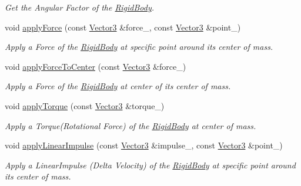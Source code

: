 \begin{DoxyCompactItemize}
\begin{DoxyCompactList}\small\item\em Get the Angular Factor of the \hyperlink{class_magnum_1_1_physics3_1_1_rigid_body}{Rigid\+Body}. \end{DoxyCompactList}\item 
void \hyperlink{class_magnum_1_1_physics3_1_1_rigid_body_a4044caf96a955b23e29e7c33cd6e837c}{apply\+Force} (const \hyperlink{class_magnum_1_1_vector3}{Vector3} \&force\+\_\+, const \hyperlink{class_magnum_1_1_vector3}{Vector3} \&point\+\_\+)
\begin{DoxyCompactList}\small\item\em Apply a Force of the \hyperlink{class_magnum_1_1_physics3_1_1_rigid_body}{Rigid\+Body} at specific point around its center of mass. \end{DoxyCompactList}\item 
void \hyperlink{class_magnum_1_1_physics3_1_1_rigid_body_a1cf514dc13d4a90274716905e82af84d}{apply\+Force\+To\+Center} (const \hyperlink{class_magnum_1_1_vector3}{Vector3} \&force\+\_\+)
\begin{DoxyCompactList}\small\item\em Apply a Force of the \hyperlink{class_magnum_1_1_physics3_1_1_rigid_body}{Rigid\+Body} at center of its center of mass. \end{DoxyCompactList}\item 
void \hyperlink{class_magnum_1_1_physics3_1_1_rigid_body_aab9670ad031cfcda566a63403a684ec3}{apply\+Torque} (const \hyperlink{class_magnum_1_1_vector3}{Vector3} \&torque\+\_\+)
\begin{DoxyCompactList}\small\item\em Apply a Torque(\+Rotational Force) of the \hyperlink{class_magnum_1_1_physics3_1_1_rigid_body}{Rigid\+Body} at center of mass. \end{DoxyCompactList}\item 
void \hyperlink{class_magnum_1_1_physics3_1_1_rigid_body_a116b77a6eac5b19e76fb48601166c5a3}{apply\+Linear\+Impulse} (const \hyperlink{class_magnum_1_1_vector3}{Vector3} \&impulse\+\_\+, const \hyperlink{class_magnum_1_1_vector3}{Vector3} \&point\+\_\+)
\begin{DoxyCompactList}\small\item\em Apply a Linear\+Impulse (Delta Velocity) of the \hyperlink{class_magnum_1_1_physics3_1_1_rigid_body}{Rigid\+Body} at specific point around its center of mass. \end{DoxyCompactList}\item 

\end{DoxyCompactItemize}
